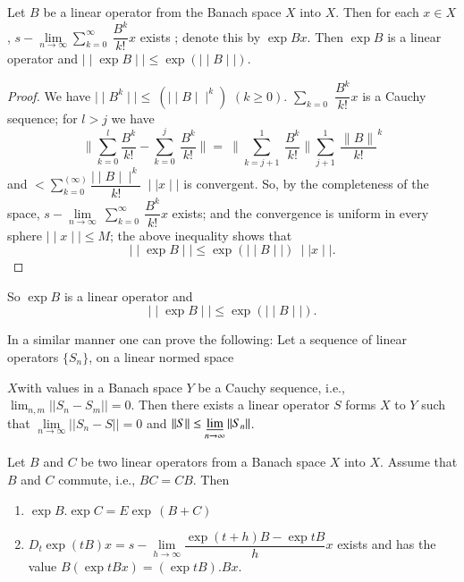 \begin{prop*}
 Let $B$ be a linear operator from the Banach space $X$ into
 $X$. Then for each $ x \in X$, $s- \lim \limits_{n \rightarrow \infty}
 \sum \limits^{\infty}_{k=0} ~ \dfrac {B^k}{k!} x $ exists ; denote
 this by $\exp Bx $. Then $\exp B$ is a linear operator and $
 \mid\mid \exp B \mid\mid \leq \exp ( \mid\mid B \mid\mid ) $. 
\end{prop*}

\begin{proof}
 We have $ \mid\mid B^k \mid\mid \leq ~ ( \mid\mid B \mid\mid^k ) $
 $(k \ge 0)$. $ \sum \limits_{k=0}$ $\dfrac{B^k}{k!} x $ is a
 Cauchy sequence; for $l> j $ we have
 $$
 \Big\| \sum^{l}_{k=0} \frac{B^k}{k!} - \sum^{j}_{k=0} ~
 \frac{B^k}{k!} \Big\| = ~ \Big\| \sum^{1}_{k= j+1} ~
 \frac{B^k}{k!} \Big\| \sum^{1}_{j+1} ~ \frac{\|B\|}{k!}^k
 $$
 and $< \sum^{(\infty)}_{k=0} \dfrac{\mid\mid B \mid\mid^k}{k!} ~
 \mid \mid x \mid\mid $ is convergent. So, by the completeness of the
 space, $ s- \lim \limits_{n \rightarrow \infty} ~ \sum
 \limits^{\infty}_{k=0} ~ \dfrac{B^k}{k!} x $ exists; and the
 convergence is uniform in every sphere $ \mid\mid x \mid\mid \leq M
 $; the above inequality shows that 
 $$
 \mid\mid \exp B \mid \mid \leq \exp ( \mid\mid B \mid\mid ) ~
 \mid\mid x \mid\mid. 
 $$ 
\end{proof}

So $ \exp B $ is a linear operator and 
$$
\mid\mid \exp B \mid\mid \leq \exp ( \mid\mid B \mid\mid ). 
$$

\begin{remark*}
 In a similar manner one can prove the following: Let a sequence of
 linear operators $ \{ S_n \} $, on a linear normed space 
\end{remark*}

$X$\pageoriginale with values in a Banach space $Y$ be a Cauchy sequence, i.e.,
$\lim_{ n, m} || S_n - S_m || = 0$. Then there exists a linear
operator $S$  forms $X$ to $Y$ such that $\lim\limits_{ n \to \infty} || S_n
- S|| = 0 $ and $\| S \| \leq \varliminf\limits_{ n \to \infty} \| S_n\|$. 
\begin{theorem*}
 Let $B$ and $C$ be two linear operators from a Banach space $X$ into
 $X$. Assume that $B$ and $C$ commute, i.e., $BC = CB$. Then 
 \begin{enumerate} [1)]
 \item $\exp B. \exp C =E\exp\, ( B + C)$
 \item $D_t \exp (tB)x = s -\lim\limits_{ h \to \infty} \dfrac{\exp (t + h)
  B - \exp t B}{h}x$ exists and has the value $B(\exp t Bx) = (\exp
  tB).Bx$. 
 \end{enumerate}
\end{theorem*}

